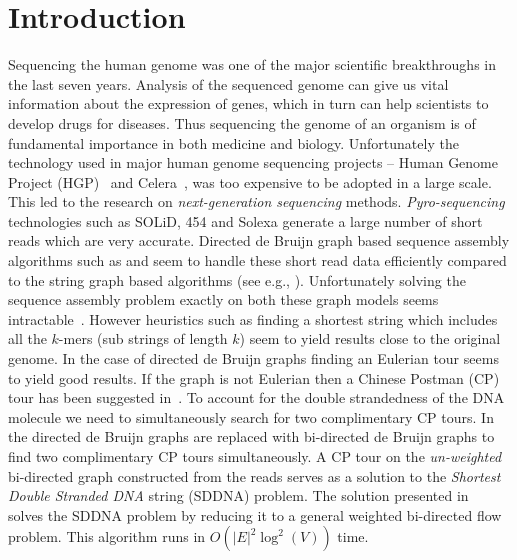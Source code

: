 \documentclass[runningheads]{llncs}
\begin{document}
\section{Introduction}

Sequencing the human genome was one of the major scientific breakthroughs in the 
last seven years. Analysis of the sequenced genome can give us vital information about the
expression of genes, which in turn can help scientists to develop drugs for diseases. Thus
sequencing the genome of an organism is of fundamental importance in both medicine and biology.
Unfortunately the technology used in major human genome sequencing projects -- Human Genome
Project (HGP)~\cite{hgp_project} and Celera~\cite{celera_project}, was too expensive to be 
adopted in a large scale. This led to the research on {\em next-generation sequencing} 
methods. {\em Pyro-sequencing} technologies such as SOLiD, 454 and Solexa generate a large number of
short reads which are very accurate. Directed de Bruijn graph based sequence assembly 
algorithms such as \cite{velvet08} and \cite{pevzner01} seem to handle these short read data efficiently 
compared to the string graph based algorithms (see e.g., \cite{myers05}). Unfortunately solving the sequence 
assembly problem exactly on both these graph models seems intractable~\cite{bidirected_graph}. 
However heuristics such as finding a shortest string which includes all the $k$-mers (sub strings 
of length $k$) seem to yield results close to the original genome. In the case of directed de Bruijn graphs finding an Eulerian tour seems to yield good results. If the graph is not Eulerian then a Chinese Postman (CP) tour has been suggested in~\cite{pevzner01}.
 To account for the double strandedness of the DNA molecule we need to simultaneously search for two complimentary CP tours. 
In~\cite{bidirected_graph} the directed de Bruijn graphs are replaced with bi-directed de Bruijn 
graphs to find two complimentary CP tours simultaneously. A CP tour on the {\em un-weighted} 
bi-directed graph constructed from the reads serves as a solution to the {\em Shortest Double Stranded DNA}  string (SDDNA) problem. The solution presented 
in~\cite{bidirected_graph} solves the SDDNA problem by reducing it to a general weighted bi-directed 
flow problem. This algorithm runs in $O(|E|^2\log^2(V))$ time. 
\end{document}
